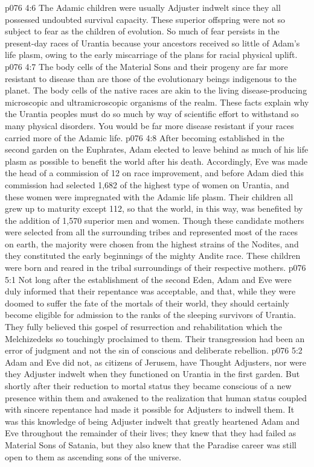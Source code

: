 \vs p076 4:6 The Adamic children were usually Adjuster indwelt since they all possessed undoubted survival capacity. These superior offspring were not so subject to fear as the children of evolution. So much of fear persists in the present\hyp{}day races of Urantia because your ancestors received so little of Adam’s life plasm, owing to the early miscarriage of the plans for racial physical uplift.
\vs p076 4:7 The body cells of the Material Sons and their progeny are far more resistant to disease than are those of the evolutionary beings indigenous to the planet. The body cells of the native races are akin to the living disease\hyp{}producing microscopic and ultramicroscopic organisms of the realm. These facts explain why the Urantia peoples must do so much by way of scientific effort to withstand so many physical disorders. You would be far more disease resistant if your races carried more of the Adamic life.
\vs p076 4:8 \pc After becoming established in the second garden on the Euphrates, Adam elected to leave behind as much of his life plasm as possible to benefit the world after his death. Accordingly, Eve was made the head of a commission of 12 on race improvement, and before Adam died this commission had selected 1,682 of the highest type of women on Urantia, and these women were impregnated with the Adamic life plasm. Their children all grew up to maturity except 112, so that the world, in this way, was benefited by the addition of 1,570 superior men and women. Though these candidate mothers were selected from all the surrounding tribes and represented most of the races on earth, the majority were chosen from the highest strains of the Nodites, and they constituted the early beginnings of the mighty Andite race. These children were born and reared in the tribal surroundings of their respective mothers.
\vs p076 5:1 Not long after the establishment of the second Eden, Adam and Eve were duly informed that their repentance was acceptable, and that, while they were doomed to suffer the fate of the mortals of their world, they should certainly become eligible for admission to the ranks of the sleeping survivors of Urantia. They fully believed this gospel of resurrection and rehabilitation which the Melchizedeks so touchingly proclaimed to them. Their transgression had been an error of judgment and not the sin of conscious and deliberate rebellion.
\vs p076 5:2 Adam and Eve did not, as citizens of Jerusem, have Thought Adjusters, nor were they Adjuster indwelt when they functioned on Urantia in the first garden. But shortly after their reduction to mortal status they became conscious of a new presence within them and awakened to the realization that human status coupled with sincere repentance had made it possible for Adjusters to indwell them. It was this knowledge of being Adjuster indwelt that greatly heartened Adam and Eve throughout the remainder of their lives; they knew that they had failed as Material Sons of Satania, but they also knew that the Paradise career was still open to them as ascending sons of the universe.
